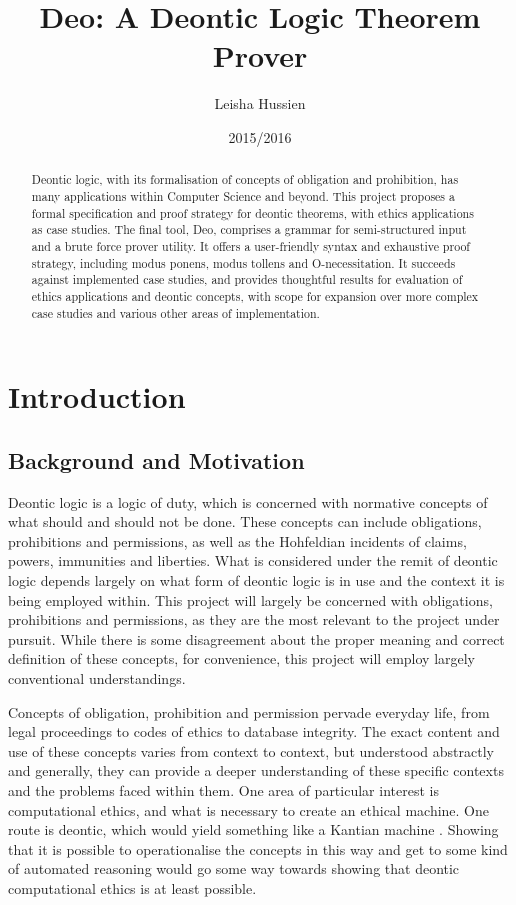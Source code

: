 \documentclass{l4proj}
\begin{document}
\title{Deo: A Deontic Logic Theorem Prover}
\author{Leisha Hussien}
\date{2015/2016}
\maketitle

\begin{abstract}
Deontic logic, with its formalisation of concepts of obligation and prohibition, has many applications within Computer Science and beyond. This project proposes a formal specification and proof strategy for deontic theorems, with ethics applications as case studies. The final tool, Deo, comprises a grammar for semi-structured input and a brute force prover utility. It offers a user-friendly syntax and exhaustive proof strategy, including modus ponens, modus tollens and O-necessitation. It succeeds against implemented case studies, and provides thoughtful results for evaluation of ethics applications and deontic concepts, with scope for expansion over more complex case studies and various other areas of implementation. 
\end{abstract}

\educationalconsent

\tableofcontents

\chapter{Introduction}

\section{Background and Motivation}
Deontic logic is a logic of duty, which is concerned with normative concepts of what should and should not be done. These concepts can include obligations, prohibitions and permissions, as well as the Hohfeldian incidents \cite{Hohfeld} of claims, powers, immunities and liberties. What is considered under the remit of deontic logic depends largely on what form of deontic logic is in use and the context it is being employed within. This project will largely be concerned with obligations, prohibitions and permissions, as they are the most relevant to the project under pursuit. While there is some disagreement about the proper meaning and correct definition of these concepts, for convenience, this project will employ largely conventional understandings. 

Concepts of obligation, prohibition and permission pervade everyday life, from legal proceedings to codes of ethics to database integrity. The exact content and use of these concepts varies from context to context, but understood abstractly and generally, they can provide a deeper understanding of these specific contexts and the problems faced within them. One area of particular interest is computational ethics, and what is necessary to create an ethical machine. One route is deontic, which would yield something like a Kantian machine \cite{Powers}. Showing that it is possible to operationalise the concepts in this way and get to some kind of automated reasoning would go some way towards showing that deontic computational ethics is at least possible. 
\end{document}
